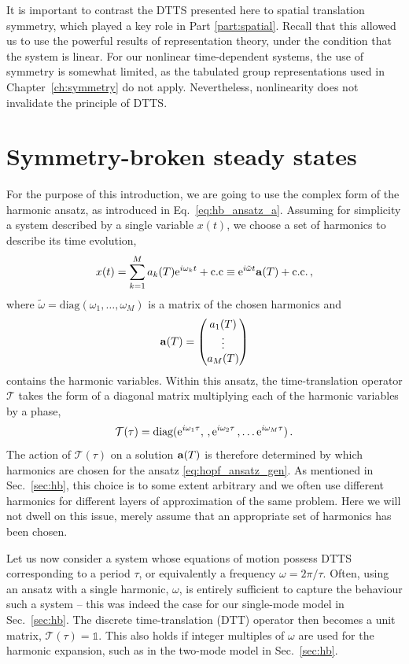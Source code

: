It is important to contrast the DTTS presented here to spatial translation symmetry, which played a key role in Part \ref{part:spatial}. Recall that this allowed us to use the powerful results of representation theory, under the condition that the system is linear. For our nonlinear time-dependent systems, the use of symmetry is somewhat limited, as the tabulated group representations used in Chapter~\ref{ch:symmetry} do not apply. Nevertheless, nonlinearity does not invalidate the principle of DTTS. 

\section{Symmetry-broken steady states}

For the purpose of this introduction, we are going to use the complex form of the harmonic ansatz, as introduced in Eq.~\eqref{eq:hb_ansatz_a}. Assuming for simplicity a system described by a single variable $x(t)$, we choose a set of harmonics to describe its time evolution,
\begin{equation} \label{eq:hopf_ansatz_gen}
	x(t) = \sum_{k=1}^M a_{k}(T) {\rm e}^{i \omega_{k} t } + \text{c.c}  \equiv  {\rm e}^{i \tilde{\omega} t} \vb{a}(T) + \text{c.c.} \,,
\end{equation}
where $\tilde{\omega} =  \text{diag}(\omega_1, \ldots, \omega_M)$ is a matrix of the chosen harmonics and
\begin{equation} \label{eq:hopf_a}
\vb{a}(T) = \mqty(a_1(T) \\ \vdots \\ a_M(T))
\end{equation}
contains the harmonic variables. Within this ansatz, the time-translation operator $\mathcal{T}$ takes the form of a diagonal matrix multiplying each of the harmonic variables by a phase,
\begin{equation}
\mathcal{T}(\tau) = \text{diag}({\rm e}^{i \omega_1 \tau} , \,, {\rm e}^{ i \omega_2 \tau} \,, \ldots {\rm e}^{i \omega_M \tau}) \,. 
\end{equation}
The action of $\mathcal{T}(\tau)$ on a solution $\vb{a}(T)$ is therefore determined by which harmonics are chosen for the ansatz \eqref{eq:hopf_ansatz_gen}. As mentioned in Sec.~\ref{sec:hb}, this choice is to some extent arbitrary and we often use different harmonics for different layers of approximation of the same problem. Here we will not dwell on this issue, merely assume that an appropriate set of harmonics has been chosen. 

Let us now consider a system whose equations of motion possess DTTS corresponding to a period $\tau$, or equivalently a frequency $\omega = 2\pi / \tau$. Often, using an ansatz with a single harmonic, $\omega$, is entirely sufficient to capture the behaviour such a system -- this was indeed the case for our single-mode model in Sec.~\ref{sec:hb}. The discrete time-translation (DTT) operator then becomes a unit matrix, $\mathcal{T}(\tau) = \mathbb{1}$. This also holds if integer multiples of $\omega$ are used for the harmonic expansion, such as in the two-mode model in Sec.~\ref{sec:hb}. 

